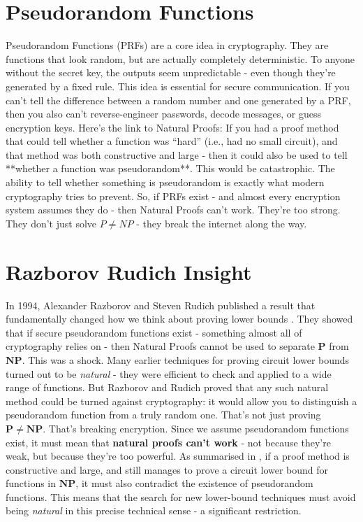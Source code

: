\documentclass[12pt]{report}
\begin{document}
\section{Pseudorandom Functions}
Pseudorandom Functions (PRFs) are a core idea in cryptography.  
They are functions that look random, but are actually completely deterministic.  
To anyone without the secret key, the outputs seem unpredictable - even though they're generated by a fixed rule.
This idea is essential for secure communication.  
If you can't tell the difference between a random number and one generated by a PRF, then you also can't reverse-engineer passwords, decode messages, or guess encryption keys.
Here's the link to Natural Proofs:  
If you had a proof method that could tell whether a function was “hard” (i.e., had no small circuit), and that method was both constructive and large - then it could also be used to tell **whether a function was pseudorandom**.
This would be catastrophic. 
The ability to tell whether something is pseudorandom is exactly what modern cryptography tries to prevent.
So, if PRFs exist - and almost every encryption system assumes they do - then Natural Proofs can't work.  
They're too strong.  
They don't just solve $P \neq NP$ - they break the internet along the way.

\section{Razborov Rudich Insight}
In 1994, Alexander Razborov and Steven Rudich published a result that fundamentally changed how we think about proving lower bounds \cite{razborov1994}.
They showed that if secure pseudorandom functions exist - something almost all of cryptography relies on - then Natural Proofs cannot be used to separate $\mathbf{P}$ from $\mathbf{NP}$.
This was a shock.
Many earlier techniques for proving circuit lower bounds turned out to be \textit{natural} - they were efficient to check and applied to a wide range of functions.  
But Razborov and Rudich proved that any such natural method could be turned against cryptography: it would allow you to distinguish a pseudorandom function from a truly random one.
That's not just proving $\mathbf{P \ne NP}$.
That's breaking encryption.  
Since we assume pseudorandom functions exist, it must mean that \textbf{natural proofs can't work} - not because they're weak, but because they're too powerful.
As summarised in \cite{arora2009}, if a proof method is constructive and large, and still manages to prove a circuit lower bound for functions in $\mathbf{NP}$, it must also contradict the existence of pseudorandom functions.
This means that the search for new lower-bound techniques must avoid being \textit{natural} in this precise technical sense - a significant restriction.
\end{document}
